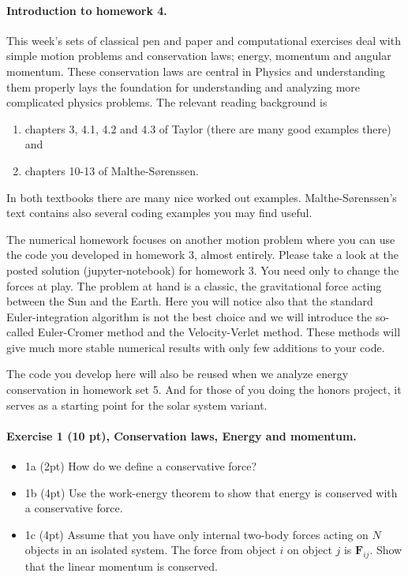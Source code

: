 \documentclass[%
oneside,                 %
final,                   %
10pt]{article}
\begin{document}
\noindent
\paragraph{Introduction to homework 4.}
This week's sets of classical pen and paper and computational
exercises deal with simple motion problems and conservation laws; energy, momentum and angular momentum. These conservation laws are central in Physics and understanding them properly lays the foundation for understanding and analyzing more complicated physics problems.
The relevant reading background is
\begin{enumerate}
\item chapters 3, 4.1, 4.2 and 4.3 of Taylor (there are many good examples there) and

\item chapters 10-13 of Malthe-Sørenssen.
\end{enumerate}

\noindent
In both textbooks there are many nice worked out examples. Malthe-Sørenssen's text contains also several coding examples you may find useful. 

The numerical homework focuses on another motion problem where you can
use the code you developed in homework 3, almost entirely. Please take
a look at the posted solution (jupyter-notebook) for homework 3. You
need only to change the forces at play. The problem at hand is a
classic, the gravitational force acting between the Sun and the
Earth. Here you will notice also that the standard Euler-integration
algorithm is not the best choice and we will introduce the so-called
Euler-Cromer method and the Velocity-Verlet method. These methods will
give much more stable numerical results with only few additions to
your code.

The code you develop here will also be reused when we analyze energy
conservation in homework set 5. And for those of you doing the honors project, it serves as a starting point for the solar system variant.

\paragraph{Exercise 1 (10 pt), Conservation laws, Energy and momentum.}
\begin{itemize}
\item 1a (2pt) How do we define a conservative force?

\item 1b (4pt) Use the work-energy theorem to show that energy is conserved with a conservative force.

\item 1c (4pt) Assume that you have only internal two-body forces acting on $N$ objects in an isolated system. The force from object $i$ on object $j$ is $\bm{F}_{ij}$. Show that the linear momentum is conserved.
\end{itemize}
\end{document}
